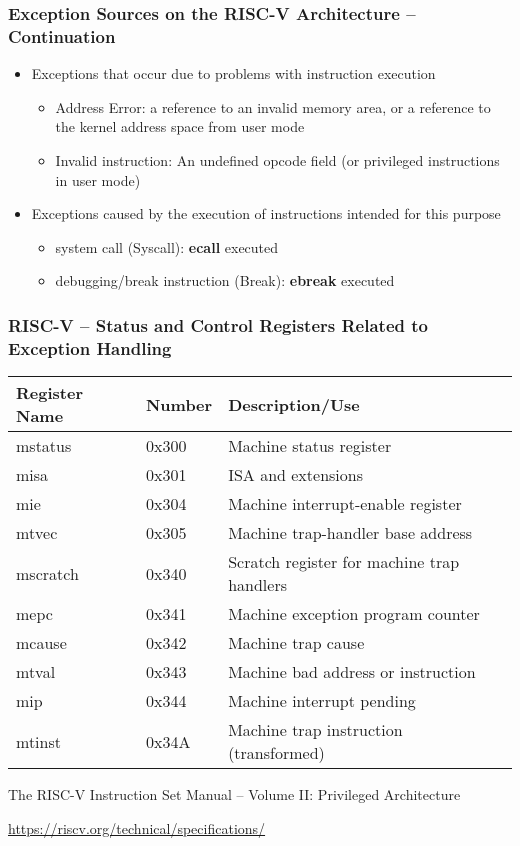 \documentclass{beamer}
\begin{document}
\begin{frame}
\frametitle{Exception Sources on the RISC-V Architecture -- Continuation}

\begin{itemize}
 \item Exceptions that occur due to problems with instruction execution
 \begin{itemize}
  \item Address Error: a reference to an invalid memory area, or a reference to the kernel address space from user mode
 \item Invalid instruction: An undefined opcode field (or privileged
instructions in user mode)
 \end{itemize}
 \item Exceptions caused by the execution of instructions intended for this purpose
 \begin{itemize}
  \item system call (Syscall): \textbf{ecall} executed
  \item debugging/break instruction (Break): \textbf{ebreak} executed
 \end{itemize}
\end{itemize}
\end{frame}

\begin{frame}
\frametitle{RISC-V -- Status and Control Registers Related to Exception Handling}

\begin{tabular}{|l|l|l|}  \hline
Register Name & Number & Description/Use \\\hline
mstatus & 0x300 & Machine status register \\\hline
misa & 0x301 & ISA and extensions \\\hline
mie & 0x304 & Machine interrupt-enable register \\\hline
mtvec & 0x305 & Machine trap-handler base address \\\hline
mscratch & 0x340 &Scratch register for machine trap handlers \\\hline
mepc & 0x341 & Machine exception program counter \\\hline
mcause & 0x342 & Machine trap cause \\\hline
mtval &0x343 & Machine bad address or instruction \\\hline
mip & 0x344 & Machine interrupt pending \\\hline
mtinst & 0x34A & Machine trap instruction (transformed) \\\hline
\end{tabular}

\vspace{3mm}

The RISC-V Instruction Set Manual – Volume II: Privileged Architecture

\url{https://riscv.org/technical/specifications/}
\end{frame}
\end{document}
